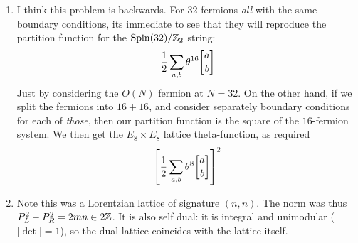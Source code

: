 \documentclass[11pt, class=article, crop=false]{standalone}
\begin{document}
\begin{enumerate}
	\item I think this problem is backwards. For 32 fermions \emph{all} with the same boundary conditions, its immediate to see that they will reproduce the partition function for the $\mathrm{Spin}(32)/\mathbb{Z}_2$ string:
	\[
		\frac12 \sum_{a,b} \theta^{16}\twist ab
	\]
	Just by considering the $O(N)$ fermion at $N=32$. On the other hand, if we split the fermions into $16+16$, and consider separately boundary conditions for each of \emph{those}, then our partition function is the square of the $16$-fermion system. We then get the $E_8 \times E_8$ lattice theta-function, as required
	\[
		\left[ \frac12 \sum_{a,b} \theta^{8}\twist ab \right]^2
	\]
	\item Note this was a Lorentzian lattice of signature $(n,n)$. The norm was thus $P_L^2 - P_R^2 = 2 m n \in 2 \mathbb{Z}$. It is also self dual: it is integral and unimodular ($|\det| = 1$), so the dual lattice coincides with the lattice itself.
	

\end{enumerate}
\end{document}
